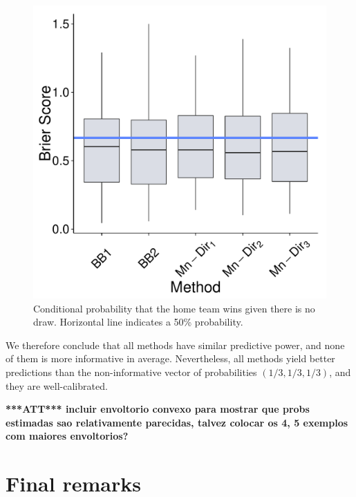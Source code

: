 \documentclass[journal,article,accept,moreauthors,pdftex,12pt,a4paper]{mdpi}
\newcommand{\red}[1]{\textbf{\color{red} ***ATT*** #1}}
\begin{document}
\begin{figure}[H]
  \centering
\includegraphics[page=11,scale=0.4]{futebolComparacaoModelosForPaper.pdf}
  \caption{Conditional probability that the home team wins given there is no draw. Horizontal line indicates a 50\%
  probability.}
  \label{fig::probMandante}
\end{figure}


We therefore conclude that all methods have similar predictive power, and none of them is more informative in average.
Nevertheless, all methods yield better predictions than the non-informative vector of probabilities $(1/3,1/3,1/3)$, and they are well-calibrated. 


\red{incluir envoltorio convexo para mostrar que probs estimadas sao relativamente parecidas, talvez colocar os 4, 5 exemplos com maiores envoltorios?}


\section{Final remarks}
\label{sec::remarks}

\end{document}
